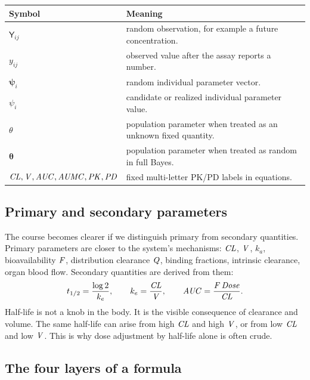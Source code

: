 \documentclass[a4paper]{article}
\newcommand{\rv}[1]{\mathsf{#1}}
\newcommand{\rtheta}{\boldsymbol{\theta}}
\newcommand{\rpsi}{\boldsymbol{\psi}}
\newcommand{\pkCL}{\pksym{CL}}
\newcommand{\pkV}{\pksym{V}}
\newcommand{\pkF}{\pksym{F}}
\newcommand{\pkAUC}{\pksym{AUC}}
\newcommand{\pkAUMC}{\pksym{AUMC}}
\newcommand{\pkke}{k_e}
\newcommand{\pkQ}{\pksym{Q}}
\newcommand{\pkPD}{\pksym{PD}}
\newcommand{\pkPK}{\pksym{PK}}
\begin{document}
\begin{center}
\begin{tabularx}{0.95\textwidth}{@{}lX@{}}
\toprule
Symbol & Meaning \\
\midrule
\(\rv{Y}_{ij}\) & random observation, for example a future concentration. \\
\(y_{ij}\) & observed value after the assay reports a number. \\
\(\rpsi_i\) & random individual parameter vector. \\
\(\psi_i\) & candidate or realized individual parameter value. \\
\(\theta\) & population parameter when treated as an unknown fixed quantity. \\
\(\rtheta\) & population parameter when treated as random in full Bayes. \\
\(\pkCL,\pkV,\pkAUC,\pkAUMC,\pkPK,\pkPD\) & fixed multi-letter PK/PD labels in equations. \\
\bottomrule
\end{tabularx}
\end{center}

\subsection{Primary and secondary parameters}

The course becomes clearer if we distinguish primary from secondary quantities. Primary parameters are closer to the system's mechanisms: \(\pkCL\), \(\pkV\), \(k_a\), bioavailability \(\pkF\), distribution clearance \(\pkQ\), binding fractions, intrinsic clearance, organ blood flow. Secondary quantities are derived from them:
\[
  t_{1/2}=\frac{\log 2}{\pkke},
  \qquad
  \pkke=\frac{\pkCL}{\pkV},
  \qquad
  \pkAUC=\frac{\pkF\,\pksym{Dose}}{\pkCL}.
\]
Half-life is not a knob in the body. It is the visible consequence of clearance and volume. The same half-life can arise from high \(\pkCL\) and high \(\pkV\), or from low \(\pkCL\) and low \(\pkV\). This is why dose adjustment by half-life alone is often crude.

\subsection{The four layers of a formula}
\end{document}
